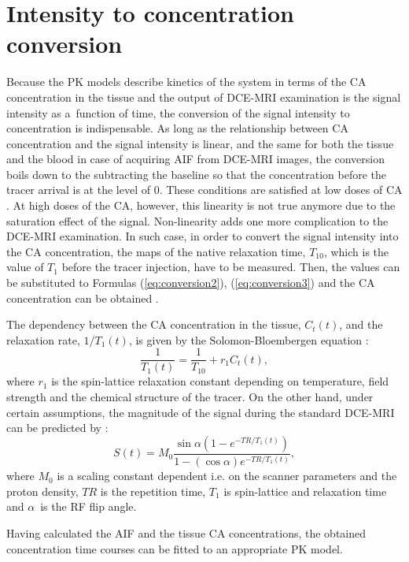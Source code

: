 \section{Intensity to concentration conversion}
Because the PK models describe kinetics of the system in terms of the CA concentration in the tissue and the output of DCE-MRI examination is the signal intensity as a~function of time, the conversion of the signal intensity to concentration is indispensable. 
As long as the relationship between CA concentration and the signal intensity  is linear, and the same for both the tissue and the blood in case of acquiring AIF from DCE-MRI images, the conversion boils down to the subtracting the baseline so that the concentration before the tracer arrival is at the level of 0. 
\newpage
\noindent These conditions are satisfied at low doses of CA \cite{khalifa2014models}.
At high doses of the CA, however, this linearity is not true anymore due to the saturation effect of the signal. Non-linearity adds one more complication to the DCE-MRI examination. In such case, in order to convert the signal intensity into the CA concentration, the maps of the native relaxation time, $T_{10}$, which is the value of $T_1$ before the tracer injection, have to be measured. Then, the values can be substituted to Formulas (\ref{eq:conversion2}), (\ref{eq:conversion3}) and the CA concentration can be obtained \cite{khalifa2014models, jackson2005dynamic, barnes2012practical}.


The dependency between the CA concentration in the tissue, $C_t(t)$,  and the relaxation rate, $1/T_1(t)$, is given by the Solomon-Bloembergen equation \cite{jackson2005dynamic}:
 \begin{equation}
 \frac{1}{T_1(t)} = \frac{1}{T_{10}}+r_1C_t(t),
 \label{eq:conversion2}
 \end{equation}
where $r_1$ is the spin-lattice relaxation constant depending on temperature, field strength and the chemical structure of the tracer. On the other hand, under certain assumptions, the magnitude of the signal during the standard DCE-MRI can be predicted by \cite{khalifa2014models, jackson2005dynamic}:
  \begin{equation}
 S(t)  = M_0\frac{\sin\alpha(1-e^{-TR/T_1(t)})}      {1-(\cos\alpha)e^{-TR/T_1(t)}},
 \label{eq:conversion3}
 \end{equation} 
where $M_0$ is a scaling constant dependent i.e. on the scanner parameters and the proton density, $TR$ is the repetition time, $T_1$ is spin-lattice and relaxation time and $\alpha$~is the RF flip angle.

Having calculated the AIF and the tissue CA concentrations, the obtained concentration time courses can be fitted to an appropriate PK model. 
